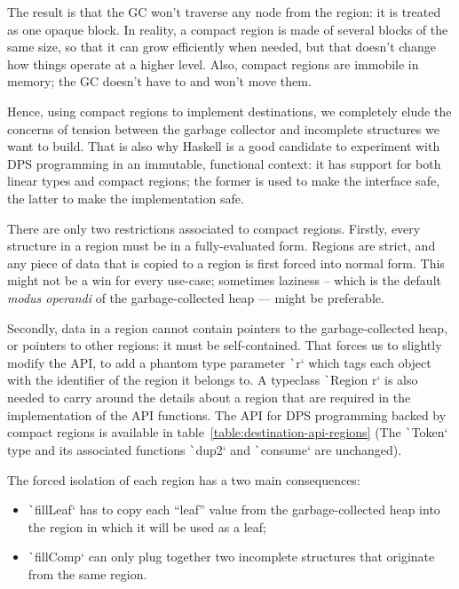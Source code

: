 \documentclass[english]{jflart}
\begin{document}
The result is that the GC won't traverse any node from the region: it is treated as one opaque block. In reality, a compact region is made of several blocks of the same size, so that it can grow efficiently when needed, but that doesn't change how things operate at a higher level. Also, compact regions are immobile in memory; the GC doesn't have to and won't move them.

Hence, using compact regions to implement destinations, we completely elude the concerns of tension between the garbage collector and incomplete structures we want to build. That is also why Haskell is a good candidate to experiment with DPS programming in an immutable, functional context: it has support for both linear types and compact regions; the former is used to make the interface safe, the latter to make the implementation safe.

There are only two restrictions associated to compact regions. Firstly, every structure in a region must be in a fully-evaluated form. Regions are strict, and any piece of data that is copied to a region is first forced into normal form. This might not be a win for every use-case; sometimes laziness -- which is the default \emph{modus operandi} of the garbage-collected heap --- might be preferable.

Secondly, data in a region cannot contain pointers to the garbage-collected heap, or pointers to other regions: it must be self-contained. That forces us to slightly modify the API, to add a phantom type parameter \texttt`r` which tags each object with the identifier of the region it belongs to. A typeclass \texttt`Region r` is also needed to carry around the details about a region that are required in the implementation of the API functions. The API for DPS programming backed by compact regions is available in table~\ref{table:destination-api-regions} (The \texttt`Token` type and its associated functions \texttt`dup2` and \texttt`consume` are unchanged).

The forced isolation of each region has a two main consequences:
\begin{itemize}
  \item \texttt`fillLeaf` has to copy each ``leaf'' value from the garbage-collected heap into the region in which it will be used as a leaf;
  \item \texttt`fillComp` can only plug together two incomplete structures that originate from the same region.
\end{itemize}
\end{document}
